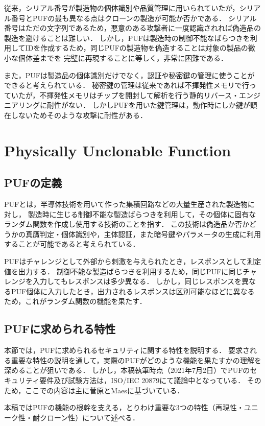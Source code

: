 \documentclass[technicalreport]{ieicej} %
\begin{document}
従来，シリアル番号が製造物の個体識別や品質管理に用いられていたが，シリアル番号とPUFの最も異なる点はクローンの製造が可能か否かである．
シリアル番号はただの文字列であるため，悪意のある攻撃者に一度認識されれば偽造品の製造を避けることは難しい．
しかし，PUFは製造時の制御不能なばらつきを利用してIDを作成するため，同じPUFの製造物を偽造することは対象の製品の微小な個体差までを
完璧に再現することに等しく，非常に困難である．

また，PUFは製造品の個体識別だけでなく，認証や秘密鍵の管理に使うことができると考えられている．
秘密鍵の管理は従来であれば不揮発性メモリで行っていたが，不揮発性メモリはチップを開封して解析を行う静的リバース・エンジニアリングに耐性がない．
しかしPUFを用いた鍵管理は，動作時にしか鍵が顕在しないためそのような攻撃に耐性がある．


\section{Physically Unclonable Function}
\subsection{PUFの定義}
PUFとは，半導体技術を用いて作った集積回路などの大量生産された製造物に対し，
製造時に生じる制御不能な製造ばらつきを利用して，その個体に固有なランダム関数を作成し使用する技術のことを指す．
この技術は偽造品か否かどうかの真贋判定・個体識別や，主体認証，また暗号鍵やパラメータの生成に利用することが可能であると考えられている．

PUFはチャレンジとして外部から刺激を与えられたとき，レスポンスとして測定値を出力する．
制御不能な製造ばらつきを利用するため，同じPUFに同じチャレンジを入力してもレスポンスは多少異なる．
しかし，同じレスポンスを異なるPUF個体に入力したとき，出力されるレスポンスは区別可能なほどに異なるため，これがランダム関数の機能を果たす．
\subsection{PUFに求められる特性}
本節では，PUFに求められるセキュリティに関する特性を説明する．
要求される重要な特性の説明を通して，実際のPUFがどのような機能を果たすかの理解を深めることが狙いである．
しかし，本稿執筆時点（2021年7月2日）でPUFのセキュリティ要件及び試験方法は，ISO/IEC 20879にて議論中となっている．
そのため，ここでの内容は主に菅原\cite{sugatake}とMaes\cite{maes1}に基づいている．

本稿ではPUFの機能の根幹を支える，とりわけ重要な3つの特性（再現性・ユニーク性・耐クローン性）について述べる．
\end{document}
